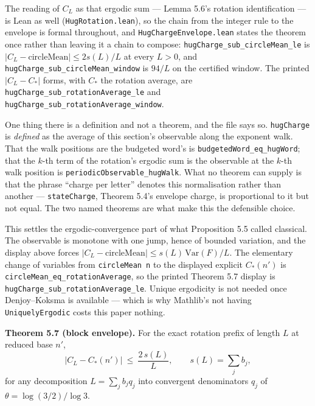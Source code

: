 \documentclass[12pt]{article}
\begin{document}
The reading of \(C_L\) as that ergodic sum --- Lemma 5.6's rotation
identification --- is Lean as well
(\texttt{\nolinkurl{HugRotation.lean}}), so the chain from the integer
rule to the envelope is formal throughout, and
\texttt{\nolinkurl{HugChargeEnvelope.lean}} states the theorem once
rather than leaving it a chain to compose:
\texttt{\nolinkurl{hugCharge_sub_circleMean_le}} is
\(|C_L-\mathrm{circleMean}|\le 2s(L)/L\) at every \(L>0\), and
\texttt{\nolinkurl{hugCharge_sub_circleMean_window}} is \(94/L\) on the
certified window. The printed \(|C_L-C_*|\) forms, with \(C_*\) the
rotation average, are
\texttt{\nolinkurl{hugCharge_sub_rotationAverage_le}} and
\texttt{\nolinkurl{hugCharge_sub_rotationAverage_window}}.

One thing there is a definition and not a theorem, and the file says so.
\texttt{\nolinkurl{hugCharge}} is \emph{defined} as the average of this
section's observable along the exponent walk. That the walk positions
are the budgeted word's is \texttt{\nolinkurl{budgetedWord_eq_hugWord}};
that the \(k\)-th term of the rotation's ergodic sum is the observable
at the \(k\)-th walk position is
\texttt{\nolinkurl{periodicObservable_hugWalk}}. What no theorem can
supply is that the phrase ``charge per letter'' denotes this
normalisation rather than another --- \texttt{\nolinkurl{stateCharge}},
Theorem 5.4's envelope charge, is proportional to it but not equal. The
two named theorems are what make this the defensible choice.

This settles the ergodic-convergence part of what Proposition 5.5 called
classical. The observable is monotone with one jump, hence of bounded
variation, and the display above forces
\(|C_L-\mathrm{circleMean}|\le s(L)\,\mathrm{Var}(F)/L\). The elementary
change of variables from \texttt{circleMean\ n\textquotesingle{}} to the
displayed explicit \(C_*(n')\) is
\texttt{\nolinkurl{circleMean_eq_rotationAverage}}, so the printed
Theorem 5.7 display is
\texttt{\nolinkurl{hugCharge_sub_rotationAverage_le}}. Unique ergodicity
is not needed once Denjoy--Koksma is available --- which is why
Mathlib's not having \texttt{\nolinkurl{UniquelyErgodic}} costs this
paper nothing.

\textbf{Theorem 5.7 (block envelope).} For the exact rotation prefix of
length \(L\) at reduced base \(n'\), \[
\bigl|C_L-C_*(n')\bigr|\ \le\ \frac{2\,s(L)}{L},
\qquad
s(L)=\sum_j b_j,
\] for any decomposition \(L=\sum_j b_jq_j\) into convergent
denominators \(q_j\) of \(\theta=\log(3/2)/\log 3\).
\end{document}
